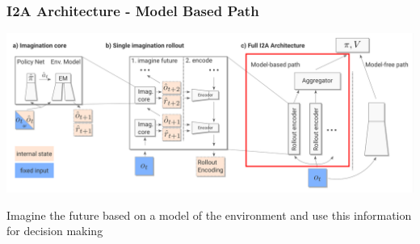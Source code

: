 %    


\begin{frame}
    \frametitle{I2A Architecture - Model Based Path}


\includegraphics[width=\columnwidth]{./Images/i2a_all_model_based_path.png}%

\begin{PraesentationAufzaehlung}
	\item Imagine the future based on a model of the environment and use this information for decision making
\end{PraesentationAufzaehlung}
    
\end{frame}
\clearpage

